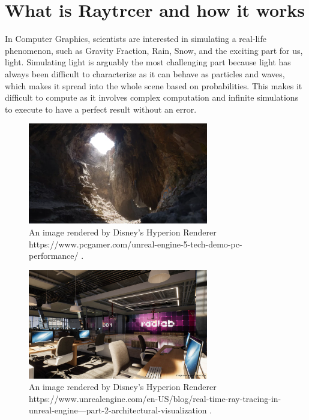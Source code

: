 \documentclass[11pt,a4paper]{article}
\begin{document}
	\section{What is Raytrcer and how it works}


		
	In Computer Graphics, scientists are interested in simulating a real-life phenomenon, such as Gravity Fraction, Rain, Snow, and the exciting part for us, light.  Simulating light is arguably the most challenging part because light has always been difficult to characterize as it can behave as particles and waves, which makes it spread into the whole scene based on probabilities. This makes it difficult to compute as it involves complex computation and infinite simulations to execute to have a perfect result without an error.
		
		
			\begin{figure}[H] 
			\centering
			\includegraphics[width=0.7\textwidth]{3.png}
			\caption{\centering An image rendered by Disney's Hyperion Renderer 		https://www.pcgamer.com/unreal-engine-5-tech-demo-pc-performance/
				\protect\cite{burley2018design}.}
		\end{figure}
		\noindent


	\begin{figure}[H] 
	\centering
	\includegraphics[width=0.7\textwidth]{2.jpg}
	\caption{\centering An image rendered by Disney's Hyperion Renderer 		https://www.unrealengine.com/en-US/blog/real-time-ray-tracing-in-unreal-engine---part-2-architectural-visualization
		 \protect\cite{burley2018design}.}
	\end{figure}
	\noindent
	
\end{document}
